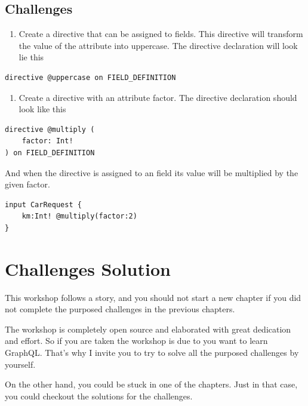 \documentclass[]{book}
\providecommand{\tightlist}{%
  \setlength{\itemsep}{0pt}\setlength{\parskip}{0pt}}
\begin{document}
\section{Challenges}\label{challenges-4}

\begin{enumerate}
\def\labelenumi{\arabic{enumi}.}
\tightlist
\item
  Create a directive \citet{uppercase} that can be assigned to fields.
  This directive will transform the value of the attribute into
  uppercase. The directive declaration will look lie this
\end{enumerate}

\begin{verbatim}
directive @uppercase on FIELD_DEFINITION
\end{verbatim}

\begin{enumerate}
\def\labelenumi{\arabic{enumi}.}
\setcounter{enumi}{1}
\tightlist
\item
  Create a directive \citet{multiply} with an attribute factor. The
  directive declaration should look like this
\end{enumerate}

\begin{verbatim}
directive @multiply (
    factor: Int!
) on FIELD_DEFINITION
\end{verbatim}

And when the directive is assigned to an field its value will be
multiplied by the given factor.

\begin{verbatim}
input CarRequest {
    km:Int! @multiply(factor:2)
}
\end{verbatim}

\chapter{Challenges Solution}\label{challenges-solution}

This workshop follows a story, and you should not start a new chapter if
you did not complete the purposed challenges in the previous chapters.

The workshop is completely open source and elaborated with great
dedication and effort. So if you are taken the workshop is due to you
want to learn GraphQL. That's why I invite you to try to solve all the
purposed challenges by yourself.

On the other hand, you could be stuck in one of the chapters. Just in
that case, you could checkout the solutions for the challenges.
\end{document}
